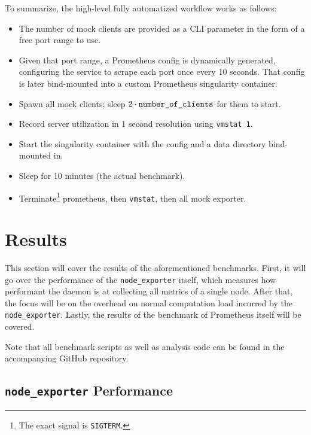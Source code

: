 To summarize, the high-level fully automatized workflow works as follows:
\begin{itemize}
  \item The number of mock clients are provided as a CLI parameter in the form of a free port range to use.
  \item Given that port range, a Prometheus config is dynamically generated, configuring the service to scrape each port once every 10 seconds. That config is later bind-mounted into a custom Prometheus singularity container.
  \item Spawn all mock clients; sleep $2 \cdot \text{\texttt{number\_of\_clients}}$ for them to start.
  \item Record server utilization in 1 second resolution using \texttt{vmstat 1}.
  \item Start the singularity container with the config and a data directory bind-mounted in.
  \item Sleep for 10 minutes (the actual benchmark).
  \item Terminate\footnote{The exact signal is \texttt{SIGTERM}.} prometheus, then \texttt{vmstat}, then all mock exporter.
\end{itemize}

\section{Results}
This section will cover the results of the aforementioned benchmarks. First, it will go over the performance of the \texttt{node\_exporter} itself, which measures how performant the daemon is at collecting all metrics of a single node. After that, the focus will be on the overhead on normal computation load incurred by the \texttt{node\_exporter}. Lastly, the results of the benchmark of Prometheus itself will be covered.

Note that all benchmark scripts as well as analysis code can be found in the accompanying GitHub repository.
\subsection{\texttt{node\_exporter} Performance}
